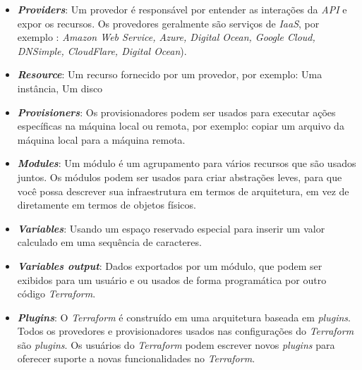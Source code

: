 \begin{itemize}
\item \textbf{\textit{Providers}}: Um provedor é responsável por entender as interações da \textit{API} e expor os recursos. Os provedores geralmente são serviços de \textit{IaaS},  por exemplo : \textit{Amazon
Web Service, Azure, Digital Ocean, Google Cloud, DNSimple, CloudFlare, Digital Ocean}).

\item \textbf{\textit{Resource}}: Um recurso fornecido por um provedor, por exemplo: Uma instância, Um disco   

\item \textbf{\textit{Provisioners}}: Os provisionadores podem ser usados para executar ações específicas na máquina local ou remota, por exemplo: copiar um arquivo da máquina local para a máquina remota.

\item \textbf{\textit{Modules}}: Um módulo é um agrupamento para vários recursos que são usados juntos. Os módulos podem ser usados para criar abstrações leves, para que você possa descrever sua infraestrutura em termos de arquitetura, em vez de diretamente em termos de objetos físicos.

\item \textbf{\textit{Variables}}: Usando um espaço reservado especial para inserir um valor calculado em uma sequência de caracteres. 

 \item \textbf{\textit{Variables output}}: Dados exportados por um módulo, que podem ser exibidos para um usuário e  ou usados de forma programática por outro código \textit{Terraform}.
 
 \item \textbf{\textit{Plugins}}: O \textit{Terraform} é construído em uma arquitetura baseada em \textit{plugins}. Todos os provedores e provisionadores usados nas configurações do \textit{Terraform} são \textit{plugins}. Os usuários do \textit{Terraform} podem escrever novos \textit{plugins} para oferecer suporte a novas funcionalidades no \textit{Terraform}.
 \end{itemize}
  

